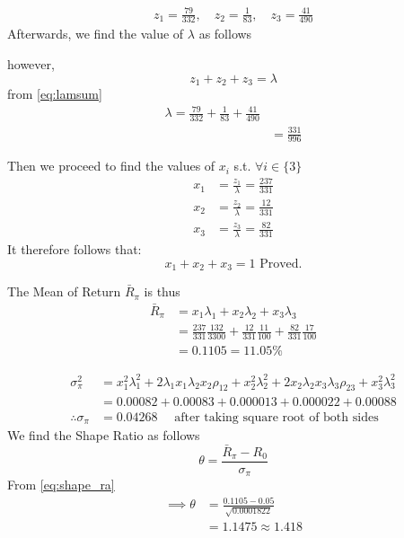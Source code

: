 \documentclass[12pt,a4paper]{article}
\begin{document}
			\begin{align*}
					z_1  =  \frac{79}{332}, \quad z_2  =  \frac{1}{83}, \quad z_3 =  \frac{41}{490}
			\end{align*}
			Afterwards, we find the value of $\lambda$  as follows
			\begin{spacing}{2.125}
				however,  
				 \begin{equation}
				 		z_1 + z_2 + z_3   = \lambda
				 			\label{eq:lamsum}
				 \end{equation}
				 from \eqref{eq:lamsum}
				 \begin{align*}
				 			\lambda  =  \frac{79}{332} +  \frac{1}{83} + \frac{41}{490}\\
				 				&=  \frac{331}{ 996}
				 \end{align*}
			\end{spacing}
			Then we proceed to find the values of $x_i$ s.t.  $\forall i \in \{3\}$
			\begin{align*}
					x_1  &=  \frac{z_1}{ \lambda}  = \frac{237}{ 331}\\
					x_2  &=  \frac{z_2}{ \lambda}  = \frac{12}{ 331}\\
					x_3  &=  \frac{z_3}{ \lambda}  = \frac{82}{ 331}
			\end{align*}
			It therefore follows that:
			\begin{equation*}
						x_1 + x_2 + x_3  =  1 \text{ Proved.}
			\end{equation*}
			\begin{spacing}{2.125}
						The Mean of Return $\bar{R}_{\pi}$ is thus
						\begin{align*}
								\bar{R}_{\pi}  &=  x_1 \lambda_1 + x_2  \lambda_2 + x_3 \lambda_3\\
										& =  \frac{237}{ 331} \frac{132}{ 3300} + \frac{12}{ 331} \frac{11}{100} + \frac{82}{ 331} \frac{17}{100}\\
										&=  0.1105 =  11.05 \%
						\end{align*}
			\end{spacing}
		\begin{align*}
							\sigma_{\pi}^2  & =   x_1^2  \lambda_1^2   + 2 \lambda_1 x_1  \lambda_2 x_2 \rho_{12}     + x_2^2 \lambda_2^2  + 2 x_2 \lambda_2  x_3 \lambda_3  \rho_{23} + x_3^2 \lambda_3^2 \\
							&=  0.00082  + 0.00083 + 0.000013 + 0.000022 + 0.00088\\
						\therefore \sigma_{\pi} &= 0.04268  \quad	\text{ after taking square root of both sides}
					\end{align*}
					We find the Shape Ratio as follows
					\begin{equation}
							\theta  =  \frac{  \bar{R} _{\pi}  -  R_0}{   \sigma_{\pi}}
							\label{eq:shape_ra}
					\end{equation}
				From \eqref{eq:shape_ra}
				\begin{align*}
						\implies \theta  &=  \frac{  0.1105   -  0.05}{  \sqrt{ 0.0001822}  }\\
						&=  1.1475 \approx  1.418
				\end{align*}
\end{document}

